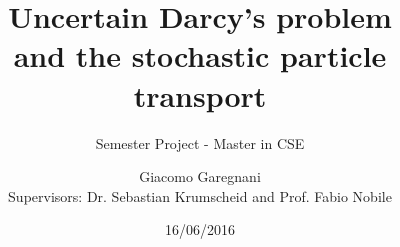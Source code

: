 \documentclass{beamer}
\title{Uncertain Darcy's problem \\ and the stochastic particle transport}
\subtitle{Semester Project - Master in CSE}
\author{Giacomo Garegnani \\ {Supervisors: Dr. Sebastian Krumscheid and Prof. Fabio Nobile}}
\institute{EPFL}
\date{16/06/2016}
\begin{document}
\frame{\titlepage}



	
\end{document}
